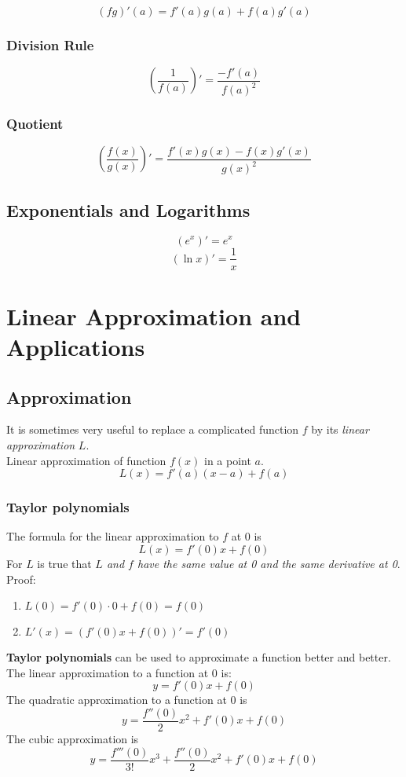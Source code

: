 \documentclass[12pt, a4paper]{scrartcl}
\begin{document}
$$(fg)'(a)=f'(a)g(a) + f(a)g'(a)$$

\subsubsection{Division Rule}
\label{sec:derivatives:computing:division}

$$(\dfrac{1}{f(a)})' = \dfrac{-f'(a)}{f(a)^2}$$

\subsubsection{Quotient}
\label{sec:derivatives:computing:quotient}

$$(\dfrac{f(x)}{g(x)})'=\dfrac{f'(x)g(x) - f(x)g'(x)}{g(x)^2}$$

\subsection{Exponentials and Logarithms}
\label{sec:derivatives:exp}
$$(e^x)' = e^x$$
$$(\ln x)' = \dfrac{1}{x}$$

\section{Linear Approximation and Applications}
\label{sec:applications}

\subsection{Approximation}
\label{sec:application:approximation}

It is sometimes very useful to replace a complicated function $f$ by its \textit{linear approximation} $L$.\\
Linear approximation of function $f(x)$ in a point $a$.
$$L(x) = f'(a)(x-a) + f(a)$$

\subsubsection{Taylor polynomials}
\label{sec:application:approximation:taylor_polynomials}
The formula for the linear approximation to $f$ at 0 is $$L(x) = f'(0)x + f(0)$$
For $L$ is true that \textit{$L$ and $f$ have the same value at 0 and the same derivative at 0}.\\
Proof: \begin{enumerate}
    \item $L(0) = f'(0) \cdot 0 + f(0) = f(0)$
    \item $L'(x) = (f'(0)x + f(0))' = f'(0)$
\end{enumerate}
\textbf{Taylor polynomials} can be used to approximate a function better and better.\\
The linear approximation to a function at 0 is: $$y=f'(0)x + f(0)$$
The quadratic approximation to a function at 0 is $$y=\dfrac{f''(0)}{2}x^2 + f'(0)x + f(0)$$
The cubic approximation is $$y = \dfrac{f'''(0)}{3!}x^3 + \dfrac{f''(0)}{2}x^2 + f'(0)x + f(0)$$
\end{document}
